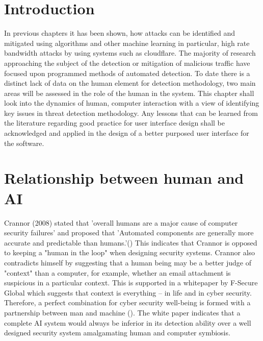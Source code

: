 \section{Introduction}
In previous chapters it has been shown, how attacks can be identified and mitigated using algorithms and other machine learning in particular, high rate bandwidth attacks by using systems such as cloudflare. The majority of research approaching the subject of the detection or mitigation of malicious traffic have focused upon programmed methods of automated detection. To date there is a distinct lack of data on the human element for detection methodology, two main areas will be assessed in the role of the human in the system. This chapter shall look into the dynamics of human, computer interaction with a view of identifying key issues in threat detection methodology. Any lessons that can be learned from the literature regarding good practice for user interface design shall be acknowledged and applied in the design of a better purposed user interface for the software. 

\section{Relationship between human and AI}

Crannor (2008) stated that 'overall humans are a major cause of computer security failures' and proposed that 'Automated components are generally more accurate and predictable than humans.'(\cite{cranor2008framework}) This indicates that Crannor is opposed to keeping a "human in the loop" when designing security systems. Crannor also contradicts himself by suggesting that a human being may be a better judge of "context" than a computer, for example, whether an email attachment is suspicious in a particular context. This is supported in a whitepaper by F-Secure Global which suggests that context is everything – in life and in cyber security. Therefore, a perfect combination for cyber security well-being is formed with a partnership between man and machine (\cite{TargetedCyberSecurity}). The white paper indicates that a complete AI system would always be inferior in its detection ability over a well designed security system amalgamating human and computer symbiosis. 

